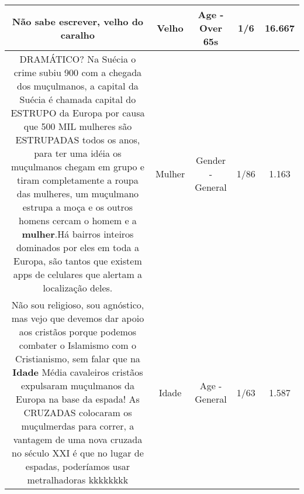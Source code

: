 \documentclass[11pt]{article}
\newlength\mylength
\begin{document}
\begin{center}
\begin{longtable}{|C{.65\mylength}|C{.30\mylength}|C{.12\mylength}|C{.12\mylength}|C{.12\mylength}|}
  \small Não sabe escrever, \textbf{velho} do caralho\normalsize   & Velho & Age - Over 65s & 1/6 & 16.667 \\  \hline
  \small DRAMÁTICO? Na Suécia o crime subiu 900 com a chegada dos muçulmanos, a capital da Suécia é chamada capital do ESTRUPO da Europa por causa que 500 MIL mulheres são ESTRUPADAS todos os anos, para ter uma idéia os muçulmanos chegam em grupo e tiram completamente a roupa das mulheres, um muçulmano estrupa a moça e os outros homens cercam o homem e a \textbf{mulher}.Há bairros inteiros dominados por eles em toda a Europa, são tantos que existem apps de celulares que alertam a localização deles.\normalsize   & Mulher & Gender - General & 1/86 & 1.163 \\  \hline
  \small Não sou religioso, sou agnóstico,  mas vejo que devemos dar apoio aos cristãos porque podemos combater o Islamismo com o Cristianismo, sem falar que na \textbf{Idade} Média cavaleiros cristãos expulsaram muçulmanos da Europa na base da espada! As CRUZADAS colocaram os muçulmerdas para correr, a vantagem de uma nova cruzada no século XXI é que no lugar de espadas, poderíamos usar metralhadoras kkkkkkkk\normalsize   & Idade & Age - General & 1/63 & 1.587 \\  \hline

\end{longtable}
\end{center}
\end{document}
